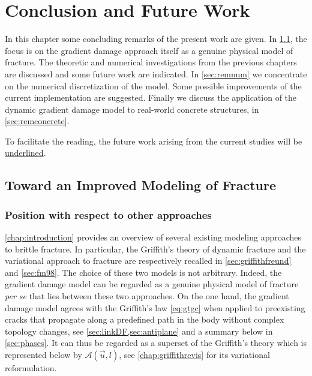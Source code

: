 \chapter{Conclusion and Future Work} \label{chap:conclusion}
\minitoc

In this chapter some concluding remarks of the present work are given. In \cref{sec:remtheo}, the focus is on the gradient damage approach itself as a genuine physical model of fracture. The theoretic and numerical investigations from the previous chapters are discussed and some future work are indicated. In \cref{sec:remnum} we concentrate on the numerical discretization of the model. Some possible improvements of the current implementation are suggested. Finally we discuss the application of the dynamic gradient damage model to real-world concrete structures, in \cref{sec:remconcrete}.

To facilitate the reading, the future work arising from the current studies will be \underline{underlined}.

\section{Toward an Improved Modeling of Fracture} \label{sec:remtheo}

\subsection{Position with respect to other approaches}
\cref{chap:introduction} provides an overview of several existing modeling approaches to brittle fracture. In particular, the Griffith's theory of dynamic fracture and the variational approach to fracture are respectively recalled in \cref{sec:griffithfreund} and \cref{sec:fm98}. The choice of these two models is not arbitrary. Indeed, the gradient damage model can be regarded as a genuine physical model of fracture \emph{per se} that lies between these two approaches. On the one hand, the gradient damage model agrees with the Griffith's law \eqref{eq:gtgc} when applied to preexisting cracks that propagate along a predefined path in the body without complex topology changes, see \cref{sec:linkDF,sec:antiplane} and a summary below in \cref{sec:phases}. It can thus be regarded as a superset of the Griffith's theory which is represented below by $\mathcal{A}(\vec{u},l)$, see \cref{chap:griffithrevis} for its variational reformulation.

